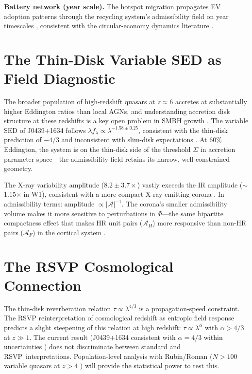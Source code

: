 \documentclass[12pt, a4paper, twoside]{book}
\theoremstyle{definition}
\theoremstyle{remark}
\newcommand{\Adm}{\mathcal{A}}
\newcommand{\RSVP}{\textsf{RSVP}}
\begin{document}
\textbf{Battery network (year scale).} The hotspot migration propagates EV adoption patterns through the recycling system's admissibility field on year timescales \citep{tian2026}, consistent with the circular-economy dynamics literature \citep{geissdoerfer2017, ciez2019}.

\section{The Thin-Disk Variable SED as Field Diagnostic}

The broader population of high-redshift quasars at $z \approx 6$ accretes at substantially higher Eddington ratios than local AGNs, and understanding accretion disk structure at these redshifts is a key open problem in SMBH growth \citep{fanetal2023, netzer2013}. The variable SED of J0439+1634 follows $\lambda f_\lambda \propto \lambda^{-1.58 \pm 0.25}$, consistent with the thin-disk prediction of $-4/3$ \citep{shakura1973} and inconsistent with slim-disk expectations \citep{abramowicz1988}. At 60\% Eddington, the system is on the thin-disk side of the threshold $\Sigma$ in accretion parameter space---the admissibility field retains its narrow, well-constrained geometry.

The X-ray variability amplitude ($8.2 \pm 3.7\times$) vastly exceeds the IR amplitude ($\sim$1.15$\times$ in W1), consistent with a more compact X-ray-emitting corona \citep{kelly2009}. In admissibility terms: amplitude $\propto |\Adm|^{-1}$. The corona's smaller admissibility volume makes it more sensitive to perturbations in $\Phi$---the same bipartite compactness effect that makes HR unit pairs ($\Adm_H$) more responsive than non-HR pairs ($\Adm_F$) in the cortical system \citep{driessen2026}.

\section{The RSVP Cosmological Connection}

The thin-disk reverberation relation $\tau \propto \lambda^{4/3}$ is a propagation-speed constraint. The RSVP reinterpretation of cosmological redshift as entropic field response predicts a slight steepening of this relation at high redshift: $\tau \propto \lambda^\alpha$ with $\alpha > 4/3$ at $z \gg 1$. The current result (J0439+1634 consistent with $\alpha = 4/3$ within uncertainties \citep{leung2026}) does not discriminate between standard and \RSVP\ interpretations. Population-level analysis with Rubin/Roman ($N > 100$ variable quasars at $z > 4$ \citep{fanetal2023, burke2021}) will provide the statistical power to test this.
\end{document}

